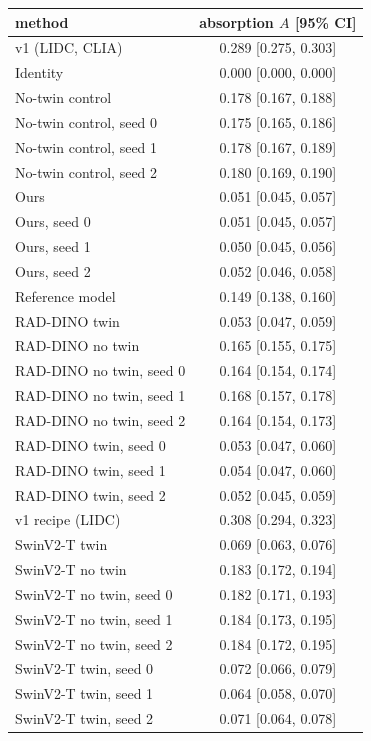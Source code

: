 \begin{tabular}{lc}
\toprule
method & absorption $A$ [95\% CI] \\
\midrule
v1 (LIDC, CLIA) & 0.289 [0.275, 0.303] \\
Identity & 0.000 [0.000, 0.000] \\
No-twin control & 0.178 [0.167, 0.188] \\
No-twin control, seed 0 & 0.175 [0.165, 0.186] \\
No-twin control, seed 1 & 0.178 [0.167, 0.189] \\
No-twin control, seed 2 & 0.180 [0.169, 0.190] \\
Ours & 0.051 [0.045, 0.057] \\
Ours, seed 0 & 0.051 [0.045, 0.057] \\
Ours, seed 1 & 0.050 [0.045, 0.056] \\
Ours, seed 2 & 0.052 [0.046, 0.058] \\
Reference model & 0.149 [0.138, 0.160] \\
RAD-DINO twin & 0.053 [0.047, 0.059] \\
RAD-DINO no twin & 0.165 [0.155, 0.175] \\
RAD-DINO no twin, seed 0 & 0.164 [0.154, 0.174] \\
RAD-DINO no twin, seed 1 & 0.168 [0.157, 0.178] \\
RAD-DINO no twin, seed 2 & 0.164 [0.154, 0.173] \\
RAD-DINO twin, seed 0 & 0.053 [0.047, 0.060] \\
RAD-DINO twin, seed 1 & 0.054 [0.047, 0.060] \\
RAD-DINO twin, seed 2 & 0.052 [0.045, 0.059] \\
v1 recipe (LIDC) & 0.308 [0.294, 0.323] \\
SwinV2-T twin & 0.069 [0.063, 0.076] \\
SwinV2-T no twin & 0.183 [0.172, 0.194] \\
SwinV2-T no twin, seed 0 & 0.182 [0.171, 0.193] \\
SwinV2-T no twin, seed 1 & 0.184 [0.173, 0.195] \\
SwinV2-T no twin, seed 2 & 0.184 [0.172, 0.195] \\
SwinV2-T twin, seed 0 & 0.072 [0.066, 0.079] \\
SwinV2-T twin, seed 1 & 0.064 [0.058, 0.070] \\
SwinV2-T twin, seed 2 & 0.071 [0.064, 0.078] \\

\end{tabular}
